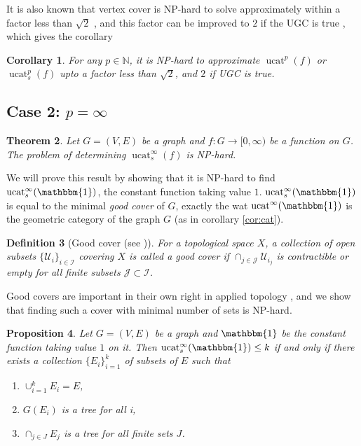 \documentclass[11pt]{article}
\DeclareMathOperator{\ucat}{ucat}
\newtheorem{thm}{Theorem}[section]
\newtheorem{prp}[thm]{Proposition}
\newtheorem{cor}[thm]{Corollary}
\newtheorem{dfn}[thm]{Definition}
\begin{document}
It is also known that vertex cover is NP-hard to solve approximately within a factor less than $\sqrt{2}$ \cite{Din18}, and this factor can be improved to $2$ if the UGC is true \cite{khot2008}, which gives the corollary 
\begin{cor}
\label{cor:cor2}
For any $p \in \mathbb{N}$, it is NP-hard to approximate $\ucat^p(f)$ or $\ucat_s^p(f)$ upto a factor less than $\sqrt{2}$, and $2$ if UGC is true.
\end{cor}

\iffalse
\subsection{Case 2: $p = \infty$}

\begin{thm}
\label{th:main2-2}
Let $G = (V,E)$ be a graph and $f : G \rightarrow [0,\infty)$ be a function on $G$. The problem of determining $\ucat_s^{\infty}(f)$ is NP-hard.
\end{thm}

We will prove this result by showing that it is NP-hard to find $\ucat_s^{\infty}(\mathbbm{1})$, the constant function taking value $1$. $\ucat_s^{\infty}(\mathbbm{1})$ is equal to the minimal \textit{good cover} of $G$, exactly the wat $\ucat^{\infty}(\mathbbm{1})$ is the geometric category of the graph $G$ (as in corollary \ref{cor:cat}). 

\begin{dfn}[Good cover (see \cite{Bot13})]
    For a topological space $X$, a collection of open subsets $\{\mathcal{U}_i\}_{i \in \mathcal{I}}$ covering $X$ is called a good cover if $\cap_{j \in \mathcal{J}} \mathcal{U}_{i_j}$ is contractible or empty for all finite subsets $\mathcal{J} \subset \mathcal{I}$.
\end{dfn}
Good covers are important in their own right  in applied topology \cite{Bot13}, and we show that finding such a cover with minimal number of sets is NP-hard.

\begin{prp}
\label{prp:min-good}
Let $G = (V,E)$ be a graph and $\mathbbm{1}$ be the constant function taking value $1$ on it. Then $\ucat_s^{\infty}(\mathbbm{1}) \leq k$ if and only if there exists a collection $\{E_i\}_{i=1}^{k}$ of subsets of $E$ such that
\begin{enumerate}
    \item $\cup_{i=1}^{k}E_i = E$,
    \item $G(E_i)$ is a tree for all i,
    \item $\cap_{j \in J} E_j$ is a tree for all finite sets $J$.
\end{enumerate}
\end{prp}
\end{document}
